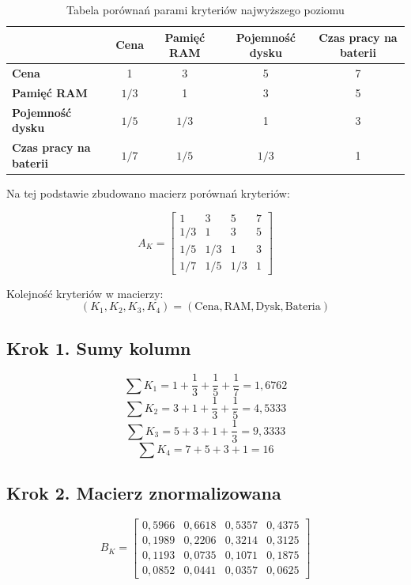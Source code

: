 \documentclass[12pt,a4paper]{article}
\begin{document}
\begin{table}[H]
\centering
\caption{Tabela porównań parami kryteriów najwyższego poziomu}
\begin{tabular}{lcccc}
\toprule
 & \textbf{Cena} & \textbf{Pamięć RAM} & \textbf{Pojemność dysku} & \textbf{Czas pracy na baterii} \\
\midrule
\textbf{Cena} & 1 & 3 & 5 & 7 \\
\textbf{Pamięć RAM} & \(1/3\) & 1 & 3 & 5 \\
\textbf{Pojemność dysku} & \(1/5\) & \(1/3\) & 1 & 3 \\
\textbf{Czas pracy na baterii} & \(1/7\) & \(1/5\) & \(1/3\) & 1 \\
\bottomrule
\end{tabular}
\end{table}

Na tej podstawie zbudowano macierz porównań kryteriów:

\[
A_K=
\begin{bmatrix}
1 & 3 & 5 & 7 \\
1/3 & 1 & 3 & 5 \\
1/5 & 1/3 & 1 & 3 \\
1/7 & 1/5 & 1/3 & 1
\end{bmatrix}
\]

Kolejność kryteriów w macierzy:
\[
(K_1,K_2,K_3,K_4)=(\text{Cena},\text{RAM},\text{Dysk},\text{Bateria})
\]


\subsection*{Krok 1. Sumy kolumn}

\[
\sum K_1 = 1+\frac13+\frac15+\frac17 = 1{,}6762
\]
\[
\sum K_2 = 3+1+\frac13+\frac15 = 4{,}5333
\]
\[
\sum K_3 = 5+3+1+\frac13 = 9{,}3333
\]
\[
\sum K_4 = 7+5+3+1 = 16
\]

\subsection*{Krok 2. Macierz znormalizowana}

\[
B_K=
\begin{bmatrix}
0{,}5966 & 0{,}6618 & 0{,}5357 & 0{,}4375 \\
0{,}1989 & 0{,}2206 & 0{,}3214 & 0{,}3125 \\
0{,}1193 & 0{,}0735 & 0{,}1071 & 0{,}1875 \\
0{,}0852 & 0{,}0441 & 0{,}0357 & 0{,}0625
\end{bmatrix}
\]
\end{document}
